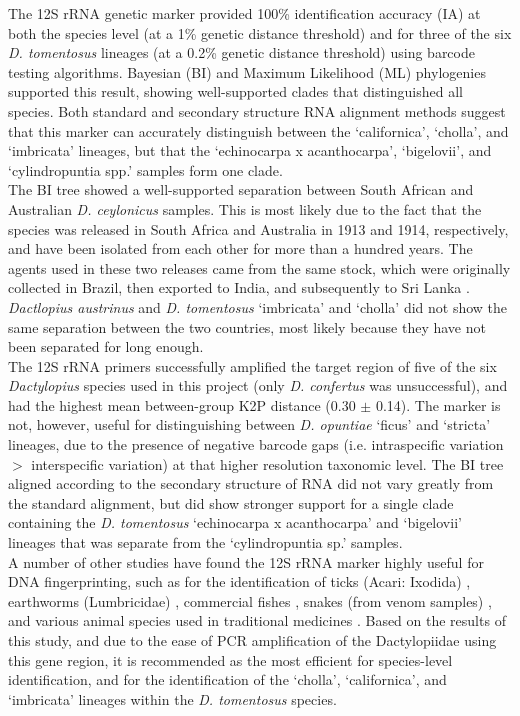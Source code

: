 The 12S rRNA genetic marker provided 100\% identification accuracy (IA) at both the species level (at a 1\% genetic distance threshold) and for three of the six \textit{D. tomentosus} lineages (at a 0.2\% genetic distance threshold) using barcode testing algorithms. Bayesian (BI) and Maximum Likelihood (ML) phylogenies supported this result, showing well-supported clades that distinguished all species. Both standard and secondary structure RNA alignment methods suggest that this marker can accurately distinguish between the `californica', `cholla', and `imbricata' lineages, but that the `echinocarpa x acanthocarpa', `bigelovii', and `cylindropuntia spp.' samples form one clade. \\
The BI tree showed a well-supported separation between South African and Australian \textit{D. ceylonicus} samples. This is most likely due to the fact that the species was released in South Africa and Australia in 1913 and 1914, respectively, and have been isolated from each other for more than a hundred years. The agents used in these two releases came from the same stock, which were originally collected in Brazil, then exported to India, and subsequently to Sri Lanka \citep{Winston2014BiologicalWeeds.}. \textit{Dactlopius austrinus} and \textit{D. tomentosus} `imbricata' and `cholla' did not show the same separation between the two countries, most likely because they have not been separated for long enough. \\ 
The 12S rRNA primers successfully amplified the target region of five of the six \textit{Dactylopius} species used in this project (only \textit{D. confertus} was unsuccessful), and had the highest mean between-group K2P distance (0.30 $\pm$ 0.14). The marker is not, however, useful for distinguishing between \textit{D. opuntiae} `ficus' and `stricta' lineages, due to the presence of negative barcode gaps (i.e. intraspecific variation $>$ interspecific variation) at that higher resolution taxonomic level. The BI tree aligned according to the secondary structure of RNA did not vary greatly from the standard alignment, but did show stronger support for a single clade containing the \textit{D. tomentosus} `echinocarpa x acanthocarpa' and `bigelovii' lineages that was separate from the `cylindropuntia sp.' samples.  \\
A number of other studies have found the 12S rRNA marker highly useful for DNA fingerprinting, such as for the identification of ticks (Acari: Ixodida) \citep{lv2014assessment}, earthworms (Lumbricidae) \citep{klarica2012comparing}, commercial fishes \citep{ardura2010dna, hardy2011dna, cawthorn2012evaluation}, snakes (from venom samples) \citep{pook2005mitochondrial}, and various animal species used in traditional medicines \citep{luo2011application}.
Based on the results of this study, and due to the ease of PCR amplification of the Dactylopiidae using this gene region, it is recommended as the most efficient for species-level identification, and for the identification of the `cholla', `californica', and `imbricata' lineages within the \textit{D. tomentosus} species.

